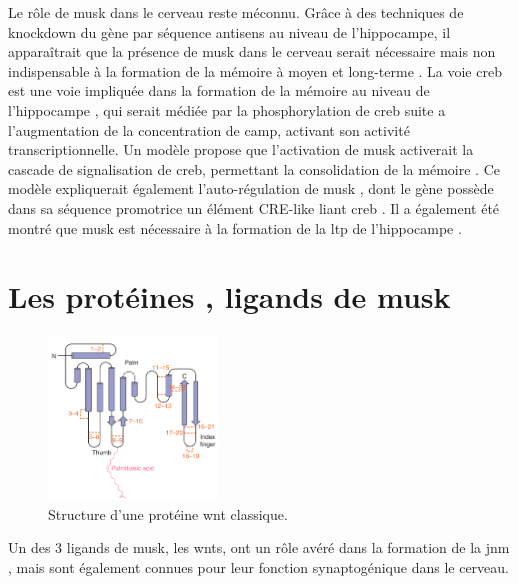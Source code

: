 	Le rôle de \gls{musk} dans le cerveau reste méconnu. Grâce à des techniques de knockdown du gène par séquence antisens au niveau de l'hippocampe, il apparaîtrait que la présence de \gls{musk} dans le cerveau serait nécessaire mais non indispensable à la formation de la mémoire à moyen et long-terme \cite{Garcia-Osta2006}. La voie \gls{creb} est une voie impliquée dans la formation de la mémoire au niveau de l'hippocampe \cite{Silva1998, Kandel2012,Kida2014,Ortega-Martinez2015}, qui serait médiée par la phosphorylation de \gls{creb} suite a l'augmentation de la concentration de \acrshort{camp}, activant son activité transcriptionnelle. Un modèle propose que l'activation de \gls{musk} activerait la cascade de signalisation de \gls{creb}, permettant la consolidation de la mémoire \cite{Garcia-Osta2006}. Ce modèle expliquerait également l'auto-régulation de \gls{musk} \cite{Moore2001}, dont le gène possède dans sa séquence promotrice un élément CRE-like liant \gls{creb} \cite{Kim2005}. Il a également été montré que \gls{musk} est nécessaire à la formation de la \gls{ltp} de l'hippocampe \cite{Garcia-Osta2006}.

\section{Les protéines , ligands de \acrshort{musk}}
\label{sec:IntroWnt}	
	\begin{figure}
		\includegraphics[width=0.4\textwidth]{./Images/WntProtein.png}	
		\caption{Structure d'une protéine \Gls{wnt} classique.}
		\label{fig:WntProt}
	\end{figure}
	
	Un des 3 ligands de \gls{musk}, les \Glspl{wnt}, ont un rôle avéré dans la formation de la \gls{jnm} \cite{Hall2000}, mais sont également connues pour leur fonction synaptogénique dans le cerveau.
	
